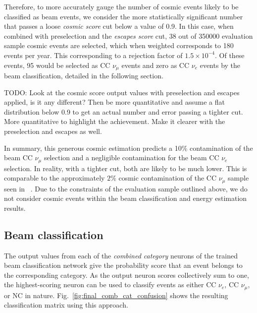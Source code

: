 Therefore, to more accurately gauge the number of cosmic events likely to be classified as beam
events, we consider the more statistically significant number that passes a loose \emph{cosmic
    score} cut below a value of 0.9. In this case, when combined with preselection and the
\emph{escapes score} cut, 38 out of 350000 evaluation sample cosmic events are selected, which
when weighted corresponds to 180 events per year. This corresponding to a rejection factor of
$1.5\times10^{-4}$. Of these events, 95 would be selected as CC $\nu_{\mu}$ events and zero as CC
$\nu_{e}$ events by the beam classification, detailed in the following section.

TODO: Look at the cosmic score output values with preselection and escapes applied, is it any
different? Then be more quantitative and assume a flat distribution below 0.9 to get an actual
number and error passing a tighter cut. More quantitative to highlight the achievement. Make it
clearer with the preselection and escapes as well.

In summary, this generous cosmic estimation predicts a 10\% contamination of the beam CC
$\nu_{\mu}$ selection and a negligible contamination for the beam CC $\nu_{e}$ selection. In
reality, with a tighter cut, both are likely to be much lower. This is comparable to the
approximately $2\%$ cosmic contamination of the CC $\nu_{\mu}$ sample seen in
\nova~\cite{acero2019}. Due to the constraints of the evaluation sample outlined above, we do not
consider cosmic events within the beam classification and energy estimation results.

\subsection{Beam classification} %
\label{sec:cvn_results_beam} %

The output values from each of the \emph{combined category} neurons of the trained beam
classification network give the probability score that an event belongs to the corresponding
category. As the output neuron scores collectively sum to one, the highest-scoring neuron can be
used to classify events as either CC $\nu_{e}$, CC $\nu_{\mu}$, or NC in nature.
Fig.~\ref{fig:final_comb_cat_confusion} shows the resulting classification matrix using this
approach.

